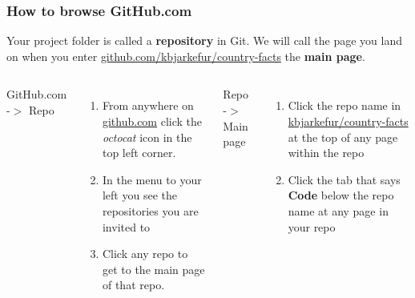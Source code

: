 \documentclass[aspectratio=169]{beamer} %
\newcommand{\trainingURL}[1]{{\color{blue}\url{#1}}}
\newcommand{\traininerUsername}{kbjarkefur}
\newcommand{\repoName}{\traininerUsername/country-facts}
\newcommand{\trainingRepoURL}[1]{\trainingURL{github.com/\repoName #1}}
\begin{document}
\begin{frame}
	\frametitle{How to browse GitHub.com}

	Your project folder is called a \textbf{repository} in Git. We will call the page you land on when you enter \trainingRepoURL{} the \textbf{main page}.

	\vspace{.5cm}

	\begin{columns}[T]

		GitHub.com -$>$ Repo
		\begin{enumerate}
			\item From anywhere on \trainingURL{github.com} click the \textit{octocat} icon in the top left corner.
			\item In the menu to your left you see the repositories you are invited to
			\item Click any repo to get to the main page of that repo.
		\end{enumerate}

		Repo -$>$ Main page
		\begin{enumerate}
			\item Click the repo name in \trainingURL{\repoName} at the top of any page within the repo
			\item Click the tab that says \textbf{Code} below the repo name at any page in your repo
		\end{enumerate}

	\end{columns}
\end{frame}
\end{document}
